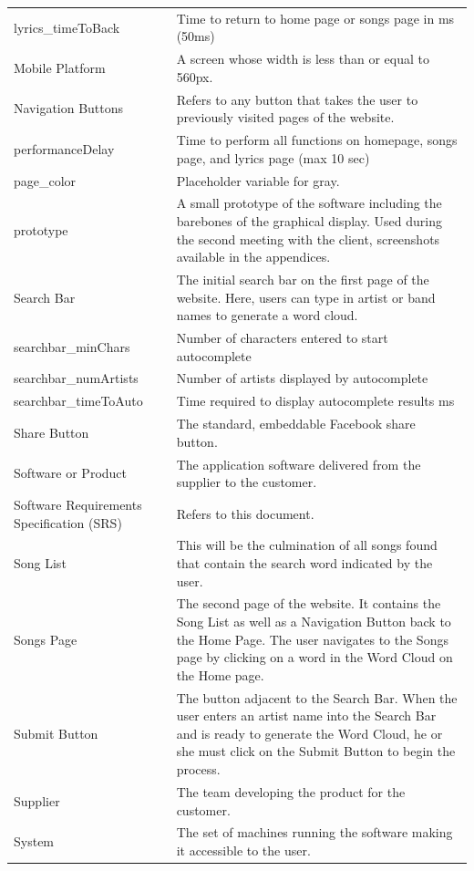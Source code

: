 \documentclass[]{article}
\begin{document}
\begin{tabular}{p{4cm}|p{8cm}}
lyrics\_timeToBack & Time to return to home page or songs page in ms (50ms)\\
Mobile Platform & A screen whose width is less than or equal to 560px. \\
Navigation Buttons & Refers to any button that takes the user to previously visited pages of the website. \\
performanceDelay & Time to perform all functions on homepage, songs page, and lyrics page (max 10 sec)\\
page\_color & Placeholder variable for gray. \\
prototype & A small prototype of the software including the barebones of the graphical display. Used during the second meeting with the client, screenshots available in the appendices. \\
Search Bar & The initial search bar on the first page of the website. Here, users can type in artist or band names to generate a word cloud. \\
searchbar\_minChars & Number of characters entered to start autocomplete\\
searchbar\_numArtists & Number of artists displayed by autocomplete\\
searchbar\_timeToAuto & Time required to display autocomplete results ms \\
Share Button & The standard, embeddable Facebook share button. \\
Software or Product & The application software delivered from the supplier to the customer.\\
Software Requirements Specification (SRS) & Refers to this document. \\
Song List & This will be the culmination of all songs found that contain the search word indicated by the user. \\
Songs Page & The second page of the website. It contains the Song List as well as a Navigation Button back to the Home Page. The user navigates to the Songs page by clicking on a word in the Word Cloud on the Home page. \\
Submit Button & The button adjacent to the Search Bar. When the user enters an artist name into the Search Bar and is ready to generate the Word Cloud, he or she must click on the Submit Button to begin the process. \\
Supplier & The team developing the product for the customer. \\
System & The set of machines running the software making it accessible to the user. \\

\end{tabular}
\end{document}
